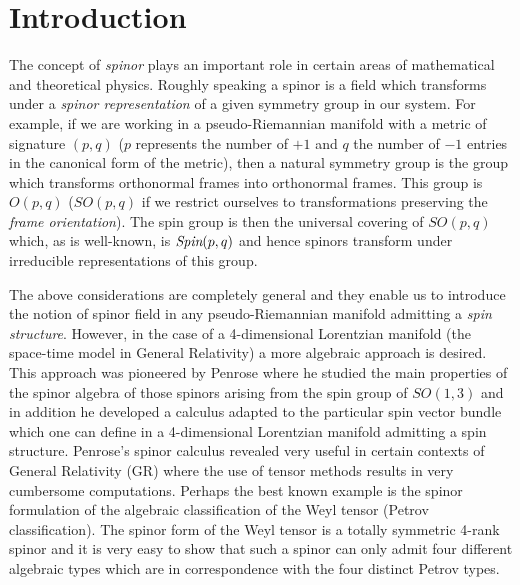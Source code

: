 \documentclass[final,3p,times,twocolumn]{elsarticle}
\begin{document}
\section{Introduction} 
The concept of {\em spinor} plays an important role in certain areas of mathematical and 
theoretical physics. Roughly speaking a spinor is a field which transforms under a 
{\em spinor representation} of a given symmetry group in our system. 
For example, if we are working in a pseudo-Riemannian manifold with a metric of 
signature $(p,q)$ ($p$ represents the number of $+1$ and $q$ the number of 
$-1$ entries in the canonical form of the metric),
then a natural symmetry group is the group which transforms orthonormal 
frames into orthonormal frames. This group is $O(p,q)$ ($SO(p,q)$ if we restrict ourselves to transformations preserving the 
{\em frame orientation}). The spin group 
is then the universal covering of
$SO(p,q)$ which, as is well-known, is $\mbox{\em Spin}(p,q)$ and hence 
spinors transform under irreducible representations of this group.

The above considerations are completely general and they enable us to introduce
the notion of spinor field in any pseudo-Riemannian manifold admitting a 
{\em spin structure}. However, in the case of a 4-dimensional Lorentzian 
manifold (the space-time model in
General Relativity) a more algebraic approach is desired. This approach was pioneered 
by Penrose \cite{PENROSE-SPINORS} where he stu\-di\-ed the main properties of the spinor
algebra of those spinors arising from the spin group of $SO(1,3)$ and in addition  
he developed a calculus adapted to the par\-ti\-cular spin vector bundle which one can define in a
4-dimensional Lorentzian manifold admitting a spin structure. Penrose's spinor calculus revealed very useful
in certain contexts of General Relativity (GR) where the use of tensor 
methods results in very cumbersome computations. 
Perhaps the best known example is the spinor formulation of the algebraic classification of the 
Weyl tensor (Petrov classification). The spinor form of the Weyl tensor is a totally symmetric 
4-rank spinor and it is very easy to show that such a spinor can only admit four different 
algebraic types which are in correspondence with the four distinct Petrov types. 
\end{document}
